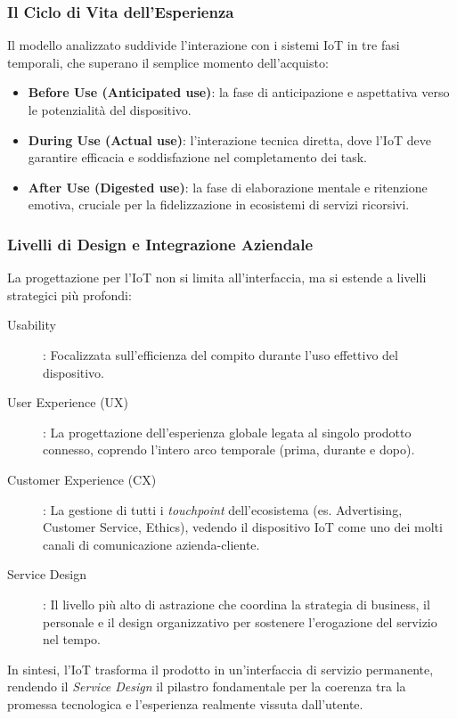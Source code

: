 \subsubsection{Il Ciclo di Vita dell'Esperienza}
Il modello analizzato suddivide l'interazione con i sistemi IoT in tre fasi temporali, che superano il semplice momento dell'acquisto:
\begin{itemize}
	\item \textbf{Before Use (Anticipated use)}: la fase di anticipazione e aspettativa verso le potenzialità del dispositivo.
	\item \textbf{During Use (Actual use)}: l'interazione tecnica diretta, dove l'IoT deve garantire efficacia e soddisfazione nel completamento dei task.
	\item \textbf{After Use (Digested use)}: la fase di elaborazione mentale e ritenzione emotiva, cruciale per la fidelizzazione in ecosistemi di servizi ricorsivi.
\end{itemize}

\subsubsection{Livelli di Design e Integrazione Aziendale}
La progettazione per l'IoT non si limita all'interfaccia, ma si estende a livelli strategici più profondi:
\begin{description}
	\item[Usability]: Focalizzata sull'efficienza del compito durante l'uso effettivo del dispositivo.
	\item[User Experience (UX)]: La progettazione dell'esperienza globale legata al singolo prodotto connesso, coprendo l'intero arco temporale (prima, durante e dopo).
	\item[Customer Experience (CX)]: La gestione di tutti i \textit{touchpoint} dell'ecosistema (es. Advertising, Customer Service, Ethics), vedendo il dispositivo IoT come uno dei molti canali di comunicazione azienda-cliente.
	\item[Service Design]: Il livello più alto di astrazione che coordina la strategia di business, il personale e il design organizzativo per sostenere l'erogazione del servizio nel tempo.
\end{description}

In sintesi, l'IoT trasforma il prodotto in un'interfaccia di servizio permanente, rendendo il \textit{Service Design} il pilastro fondamentale per la coerenza tra la promessa tecnologica e l'esperienza realmente vissuta dall'utente.

